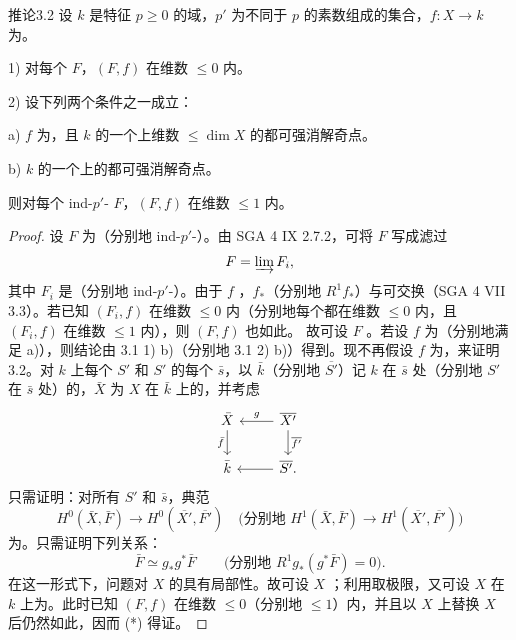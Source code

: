 \begin{SGAresult}{推论}{3.2}
设 $k$ 是特征 $p\geq0$ 的域，$p'$ 为不同于 $p$ 的素数组成的集合，$f:X\to k$ 为。

1) 对每个 $F$，$(F,f)$ 在维数 $\leq0$ 内。

2) 设下列两个条件之一成立：

a) $f$ 为，且 $k$ 的一个上维数 $\leq\dim X$ 的都可强消解奇点。

b) $k$ 的一个上的都可强消解奇点。

则对每个 ind-$p'$- $F$，$(F,f)$ 在维数 $\leq1$ 内。
\end{SGAresult}
\begin{proof}
设 $F$ 为（分别地 ind-$p'$-）。由 SGA 4 IX 2.7.2，可将 $F$ 写成滤过
\[F=\varinjlim F_i,\]
其中 $F_i$ 是（分别地 ind-$p'$-）。由于 $f$ ，$f_*$（分别地 $R^1f_*$）与可交换（SGA 4 VII 3.3）。若已知 $(F_i,f)$ 在维数 $\leq0$ 内（分别地每个都在维数 $\leq0$ 内，且 $(F_i,f)$ 在维数 $\leq1$ 内），则 $(F,f)$ 也如此。
故可设 $F$ 。若设 $f$ 为（分别地满足 a)），则结论由 3.1 1) b)（分别地 3.1 2) b)）得到。现不再假设 $f$ 为，来证明 3.2。对 $k$ 上每个 $S'$ 和 $S'$ 的每个 $\bar s$，以 $\bar k$（分别地 $\overline{S'}$）记 $k$ 在 $\bar s$ 处（分别地 $S'$ 在 $\bar s$ 处）的，$\bar X$ 为 $X$ 在 $\bar k$ 上的，并考虑
\[
\begin{tikzcd}
\bar X\arrow[d,"\bar f"']&\overline{X'}\arrow[l,"g"']\arrow[d,"\overline{f'}"]\\
\bar k&\overline{S'}\arrow[l].
\end{tikzcd}
\]
只需证明：对所有 $S'$ 和 $\bar s$，典范
\[
H^0(\bar X,\bar F)\longrightarrow H^0(\overline{X'},\overline{F'})
\quad\bigl(\text{分别地 }H^1(\bar X,\bar F)\longrightarrow H^1(\overline{X'},\overline{F'})\bigr)
\]
为。只需证明下列关系：
\[
\bar F\simeq g_*g^*\bar F
\qquad\bigl(\text{分别地 }R^1g_*(g^*\bar F)=0\bigr).\tag{*}
\]
在这一形式下，问题对 $X$ 的具有局部性。故可设 $X$ ；利用取极限，又可设 $X$ 在 $k$ 上为。此时已知 $(F,f)$ 在维数 $\leq0$（分别地 $\leq1$）内，并且以 $X$ 上替换 $X$ 后仍然如此，因而 (*) 得证。
\end{proof}

